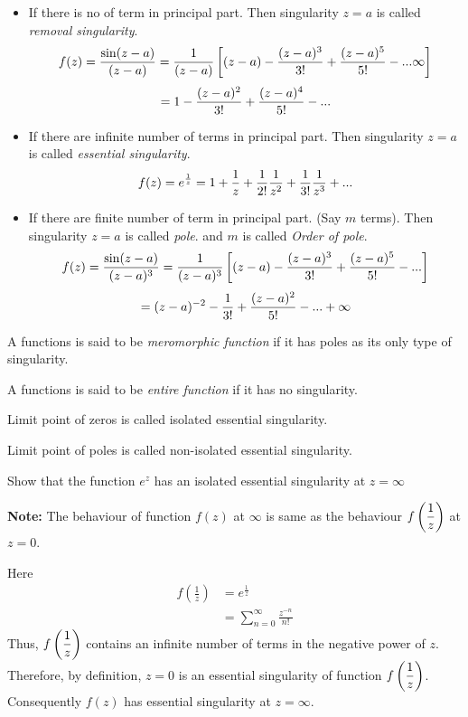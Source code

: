 \begin{itemize}
	\item  If there is no of term in principal part. Then singularity $z=a$ is called \textit{removal singularity}.
	\[f(z) = {\sin (z-a) \over (z-a)} = {1 \over (z-a)}\left[(z-a) -{(z-a)^3 \over 3!}+{(z-a)^5 \over 5!} - ... \infty \right] \]
	\[= 1 -{(z-a)^2 \over 3!}+{(z-a)^4 \over 5!} - ... \]
	\item  If there are infinite number of terms in principal part. Then singularity $z=a$ is called \textit{essential singularity}.
		\[f(z) = e^{1 \over z} =  1 +{1 \over z}+{1 \over 2!}{1 \over z^2} +{1 \over 3!}{1 \over z^3} + ...\]
	\item If there are finite number of term in principal part. (Say $m$ terms). Then singularity $z=a$ is called \textit{pole}. and $m$ is called \emph{Order of pole}.  
	\[f(z) = {\sin (z-a) \over (z-a)^3} = {1 \over (z-a)^3}\left[(z-a) -{(z-a)^3 \over 3!}+{(z-a)^5 \over 5!} - ... \right] \]
	\[= (z-a)^{-2} -{1 \over 3!} + {(z-a)^2 \over 5!} - ... + \infty \]
\end{itemize}
\begin{definition}
A functions is said to be \textit{meromorphic function} if it has poles as its only type of singularity.
\end{definition}
\begin{definition}
A functions is said to be \textit{entire function} if it has no singularity.
\end{definition}
\begin{definition}
Limit point of zeros is called isolated essential singularity.
\end{definition}
\begin{definition}
Limit point of poles is called non-isolated essential singularity.
\end{definition}
\begin{example}
Show that the function $e^z$ has an isolated essential singularity at $z=\infty$
\end{example}
\begin{solution}
\textbf{Note: } The behaviour of function $f(z)$ at $\infty$ is same as the behaviour $\displaystyle f\left(\frac{1}{z}\right)$ at $z=0$.

Here
\begin{align*}
	f\left(\frac{1}{z}\right) &= e^{\frac{1}{z}}\\
	&= \sum_{n=0}^{\infty}\frac{z^{-n}}{n!}
\end{align*}
Thus, $\displaystyle 	f\left(\frac{1}{z}\right) $ contains an infinite number of terms in the negative power of $z$. Therefore, by definition, $z=0$ is an essential singularity of  function $\displaystyle 	f\left(\frac{1}{z}\right) $. Consequently $f(z)$ has essential singularity at $z=\infty$.
\end{solution}
